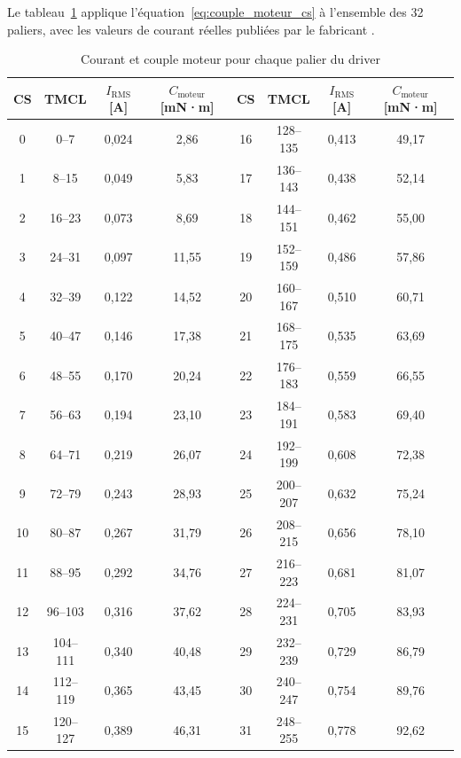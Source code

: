 Le tableau~\ref{tab:echelons_couple} applique l'équation~\eqref{eq:couple_moteur_cs}
à l'ensemble des 32 paliers, avec les valeurs de courant réelles publiées
par le fabricant \cite{trinamic_tmcm_1021}.

\begin{table}[H]
  \centering
  \caption{Courant et couple moteur pour chaque palier du driver \cite{trinamic_tmcm_1021}}
  \label{tab:echelons_couple}
  \begin{tabular}{|c|c|c|c||c|c|c|c|}
    \hline
    \textbf{CS} & \textbf{TMCL} & \textbf{$I_{\text{RMS}}$ [A]} & \textbf{$C_{\text{moteur}}$ [mN·m]}
      & \textbf{CS} & \textbf{TMCL} & \textbf{$I_{\text{RMS}}$ [A]} & \textbf{$C_{\text{moteur}}$ [mN·m]} \\
    \hline
    0  & 0--7     & 0,024 & 2,86  & 16 & 128--135 & 0,413 & 49,17 \\
    1  & 8--15    & 0,049 & 5,83  & 17 & 136--143 & 0,438 & 52,14 \\
    2  & 16--23   & 0,073 & 8,69  & 18 & 144--151 & 0,462 & 55,00 \\
    3  & 24--31   & 0,097 & 11,55 & 19 & 152--159 & 0,486 & 57,86 \\
    4  & 32--39   & 0,122 & 14,52 & 20 & 160--167 & 0,510 & 60,71 \\
    5  & 40--47   & 0,146 & 17,38 & 21 & 168--175 & 0,535 & 63,69 \\
    6  & 48--55   & 0,170 & 20,24 & 22 & 176--183 & 0,559 & 66,55 \\
    7  & 56--63   & 0,194 & 23,10 & 23 & 184--191 & 0,583 & 69,40 \\
    8  & 64--71   & 0,219 & 26,07 & 24 & 192--199 & 0,608 & 72,38 \\
    9  & 72--79   & 0,243 & 28,93 & 25 & 200--207 & 0,632 & 75,24 \\
    10 & 80--87   & 0,267 & 31,79 & 26 & 208--215 & 0,656 & 78,10 \\
    11 & 88--95   & 0,292 & 34,76 & 27 & 216--223 & 0,681 & 81,07 \\
    12 & 96--103  & 0,316 & 37,62 & 28 & 224--231 & 0,705 & 83,93 \\
    13 & 104--111 & 0,340 & 40,48 & 29 & 232--239 & 0,729 & 86,79 \\
    14 & 112--119 & 0,365 & 43,45 & 30 & 240--247 & 0,754 & 89,76 \\
    15 & 120--127 & 0,389 & 46,31 & 31 & 248--255 & 0,778 & 92,62 \\
    \hline
  \end{tabular}
\end{table}

